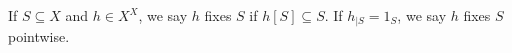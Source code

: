 If $S \subseteq X$ and $h \in X^X$, we say $h$ fixes $S$ if $h[S] \subseteq S$. If $h_{|S} = 1_S$, we say $h$ fixes $S$ pointwise.
